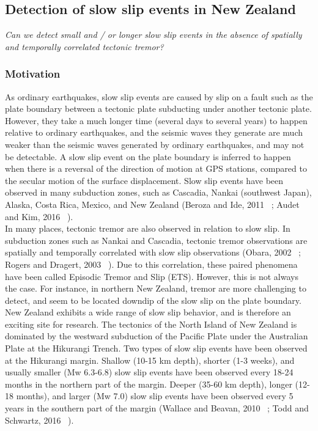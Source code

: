 \documentclass[letterpaper, 12pt]{article}
\begin{document}
\subsection{Detection of slow slip events in New Zealand}

\textit{Can we detect small and / or longer slow slip events in the absence of spatially and temporally correlated tectonic tremor?}

\subsubsection*{Motivation}

As ordinary earthquakes, slow slip events are caused by slip on a fault such as the plate boundary between a tectonic plate subducting under another tectonic plate. However, they take a much longer time (several days to several years) to happen relative to ordinary earthquakes, and the seismic waves they generate are much weaker than the seismic waves generated by ordinary earthquakes, and may not be detectable.  A slow slip event on the plate boundary is inferred to happen when there is a reversal of the direction of motion at GPS stations, compared to the secular motion of the surface displacement. Slow slip events have been observed in many subduction zones, such as Cascadia, Nankai (southwest Japan), Alaska, Costa Rica, Mexico, and New Zealand (Beroza and Ide, 2011 ~\cite{BER_2011}; Audet and Kim, 2016 ~\cite{AUD_2016}). \\

In many places, tectonic tremor are also observed in relation to slow slip. In subduction zones such as Nankai and Cascadia, tectonic tremor observations are spatially and temporally correlated with slow slip observations (Obara, 2002 ~\cite{OBA_2002}; Rogers and Dragert, 2003 ~\cite{ROG_2003}). Due to this correlation, these paired phenomena have been called Episodic Tremor and Slip (ETS). However, this is not always the case. For instance, in northern New Zealand, tremor are more challenging to detect, and seem to be located downdip of the slow slip on the plate boundary. \\

New Zealand exhibits a wide range of slow slip behavior, and is therefore an exciting site for research. The tectonics of the North Island of New Zealand is dominated by the westward subduction of the Pacific Plate under the Australian Plate at the Hikurangi Trench. Two types of slow slip events have been observed at the Hikurangi margin. Shallow (10-15 km depth), shorter (1-3 weeks), and usually smaller (Mw 6.3-6.8) slow slip events have been observed every 18-24 months in the northern part of the margin. Deeper (35-60 km depth), longer (12-18 months), and larger (Mw 7.0) slow slip events have been observed every 5 years in the southern part of the margin (Wallace and Beavan, 2010 ~\cite{WAL_2010}; Todd and Schwartz, 2016 ~\cite{TOD_2016}).\\
\end{document}
